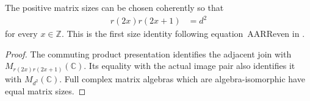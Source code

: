\begin{lemma}
    \label{lem:qca_image_pair_matrix_sizes}
    \leanok
    The positive matrix sizes can be chosen coherently so that
    \begin{align}
        r(2x)r(2x+1) & =d^2
        \label{eq:qca_image_pair_matrix_sizes}
    \end{align}
    for every $x\in\mathbb Z$. This is the first size identity following
    equation~AARReven in \cite[lines~1287--1290]{Gross2012IndexTheory}.
\end{lemma}
\begin{proof}\leanok
    The commuting product presentation identifies the adjacent join with
    $M_{r(2x)r(2x+1)}(\mathbb C)$. Its equality with the actual image pair
    also identifies it with $M_{d^2}(\mathbb C)$. Full complex matrix
    algebras which are algebra-isomorphic have equal matrix sizes.
\end{proof}

